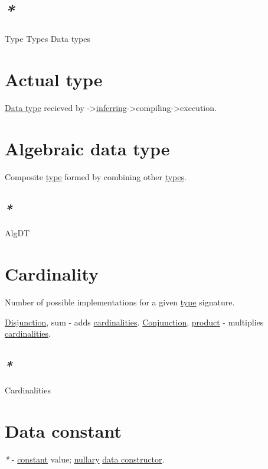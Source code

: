 \documentclass[a4paper,14pt,oneside]{book}
\begin{document}
\section{\emph{*}}
\label{sec:org697ed11}

\label{orgde40363}Type
\label{org91cf53a}Types
\label{org4c2b265}Data types

\section{\label{org004b0be}Actual type}
\label{sec:org528f6b0}
\hyperref[org89def2c]{Data type} recieved by ->\hyperref[org5b8c057]{inferring}->compiling->execution.

\section{\label{org65222de}Algebraic data type}
\label{sec:orga31d4d6}
Composite \hyperref[orgde40363]{type} formed by combining other \hyperref[org91cf53a]{types}.

\subsection{\emph{*}}
\label{sec:org20f42c6}

\label{orgc5125be}AlgDT

\section{\label{org650116d}Cardinality}
\label{sec:orgccdb3ab}
Number of possible implementations for a given \hyperref[orgde40363]{type} signature.

\hyperref[orge40fe3e]{Disjunction}, sum - adds \hyperref[orgffedf06]{cardinalities}.
\hyperref[org55068cf]{Conjunction}, \hyperref[org917411a]{product} - multiplies \hyperref[orgffedf06]{cardinalities}.

\subsection{\emph{*}}
\label{sec:org4e63df6}
\label{orgffedf06}Cardinalities

\section{\label{orga8f3fb7}Data constant}
\label{sec:org9d57641}
\emph{*} - \hyperref[org5f03168]{constant} value; \hyperref[orga8b235e]{nullary} \hyperref[orgb1a2b7f]{data constructor}.
\end{document}
